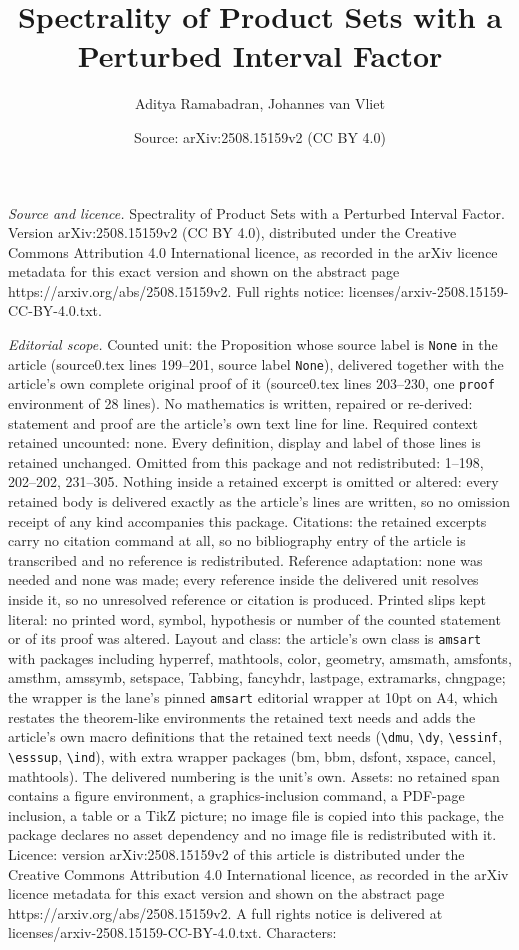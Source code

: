 \documentclass[10pt,a4paper]{amsart}
\title[Spectrality of Product Sets with a Perturbed Interval Factor]{Spectrality of Product Sets with a Perturbed Interval Factor}
\author{Aditya Ramabadran, Johannes van Vliet}
\date{Source: arXiv:2508.15159v2 (CC BY 4.0)}
\begin{document}
\maketitle

\noindent\emph{Source and licence.} Spectrality of Product Sets with a Perturbed Interval Factor. Version arXiv:2508.15159v2 (CC BY 4.0), distributed under the Creative Commons Attribution 4.0 International licence, as recorded in the arXiv licence metadata for this exact version and shown on the abstract page https://arxiv.org/abs/2508.15159v2. Full rights notice: licenses/arxiv-2508.15159-CC-BY-4.0.txt.\par\smallskip

\noindent\textit{Editorial scope.} Counted unit: the Proposition whose source label is \texttt{None} in the article (source0.tex lines 199--201, source label \texttt{None}), delivered together with the article's own complete original proof of it (source0.tex lines 203--230, one \texttt{proof} environment of 28 lines). No mathematics is written, repaired or re-derived: statement and proof are the article's own text line for line. Required context retained uncounted: none. Every definition, display and label of those lines is retained unchanged. Omitted from this package and not redistributed: 1--198, 202--202, 231--305. Nothing inside a retained excerpt is omitted or altered: every retained body is delivered exactly as the article's lines are written, so no omission receipt of any kind accompanies this package. Citations: the retained excerpts carry no citation command at all, so no bibliography entry of the article is transcribed and no reference is redistributed. Reference adaptation: none was needed and none was made; every reference inside the delivered unit resolves inside it, so no unresolved reference or citation is produced. Printed slips kept literal: no printed word, symbol, hypothesis or number of the counted statement or of its proof was altered. Layout and class: the article's own class is \texttt{amsart} with packages including hyperref, mathtools, color, geometry, amsmath, amsfonts, amsthm, amssymb, setspace, Tabbing, fancyhdr, lastpage, extramarks, chngpage; the wrapper is the lane's pinned \texttt{amsart} editorial wrapper at 10pt on A4, which restates the theorem-like environments the retained text needs and adds the article's own macro definitions that the retained text needs (\texttt{\textbackslash dmu}, \texttt{\textbackslash dy}, \texttt{\textbackslash essinf}, \texttt{\textbackslash esssup}, \texttt{\textbackslash ind}), with extra wrapper packages (bm, bbm, dsfont, xspace, cancel, mathtools). The delivered numbering is the unit's own. Assets: no retained span contains a figure environment, a graphics-inclusion command, a PDF-page inclusion, a table or a TikZ picture; no image file is copied into this package, the package declares no asset dependency and no image file is redistributed with it. Licence: version arXiv:2508.15159v2 of this article is distributed under the Creative Commons Attribution 4.0 International licence, as recorded in the arXiv licence metadata for this exact version and shown on the abstract page https://arxiv.org/abs/2508.15159v2. A full rights notice is delivered at licenses/arxiv-2508.15159-CC-BY-4.0.txt. Characters: 
\end{document}
